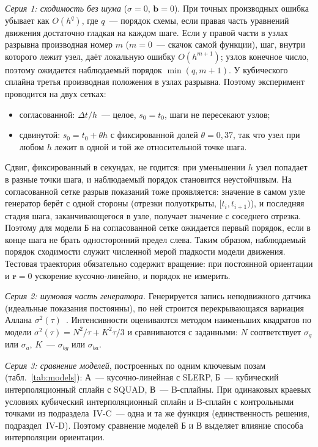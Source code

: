 \documentclass{misisarticle}
\newcommand{\vb}[1]{\mathbf{#1}}
\begin{document}
\textit{Серия 1: сходимость без шума} ($\sigma=0$, $\vb b=0$). При точных производных ошибка убывает как $O(h^q)$, где $q$~--- порядок схемы, если правая часть уравнений движения достаточно гладкая на каждом шаге. Если у правой части в узлах разрывна производная номер $m$ ($m=0$~--- скачок самой функции), шаг, внутри которого лежит узел, даёт локальную ошибку $O(h^{m+1})$; узлов конечное число, поэтому ожидается наблюдаемый порядок $\min(q, m+1)$. У кубического сплайна третья производная положения в узлах разрывна. Поэтому эксперимент проводится на двух сетках:
\begin{itemize}
  \item согласованной: $\Delta t/h$~--- целое, $s_0=t_0$, шаги не пересекают узлов;
  \item сдвинутой: $s_0=t_0+\theta h$ с фиксированной долей $\theta=0{,}37$, так что узел при любом $h$ лежит в одной и той же относительной точке шага.
\end{itemize}
Сдвиг, фиксированный в секундах, не годится: при уменьшении $h$ узел попадает в разные точки шага, и наблюдаемый порядок становится неустойчивым. На согласованной сетке разрыв показаний тоже проявляется: значение в самом узле генератор берёт с одной стороны (отрезки полуоткрыты, $[t_i,t_{i+1})$), и последняя стадия шага, заканчивающегося в узле, получает значение с соседнего отрезка. Поэтому для модели Б на согласованной сетке ожидается первый порядок, если в конце шага не брать односторонний предел слева. Таким образом, наблюдаемый порядок сходимости служит численной мерой гладкости модели движения. Тестовая траектория обязательно содержит вращение: при постоянной ориентации и $\vb r=0$ ускорение кусочно-линейно, и порядок не измерить.

\textit{Серия 2: шумовая часть генератора.} Генерируется запись неподвижного датчика (идеальные показания постоянны), по ней строится перекрывающаяся вариация Аллана $\sigma^2(\tau)$~\cite{ieee952}. Интенсивности оцениваются методом наименьших квадратов по модели $\sigma^2(\tau)=N^2/\tau+K^2\tau/3$ и сравниваются с заданными: $N$ соответствует $\sigma_g$ или $\sigma_a$, $K$~--- $\sigma_{bg}$ или $\sigma_{ba}$.

\textit{Серия 3: сравнение моделей}, построенных по одним ключевым позам (табл.~\ref{tab:models}): А~--- кусочно-линейная с SLERP, Б~--- кубический интерполяционный сплайн с SQUAD, В~--- B-сплайны. При одинаковых краевых условиях кубический интерполяционный сплайн и B-сплайн с контрольными точками из подраздела~IV-C~--- одна и та же функция (единственность решения, подраздел~IV-D). Поэтому сравнение моделей Б и В выделяет влияние способа интерполяции ориентации.
\end{document}
